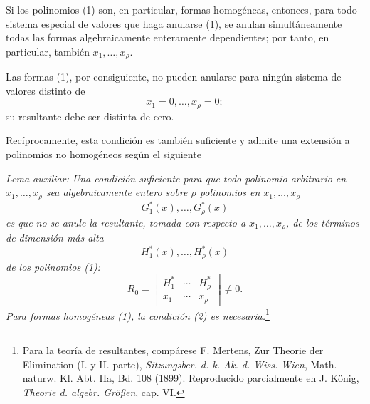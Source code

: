 \documentclass[11pt]{article}
\begin{document}
Si los polinomios (1) son, en particular, formas homogéneas, entonces, para todo sistema especial de valores que haga anularse (1), se anulan simultáneamente todas las formas algebraicamente enteramente dependientes; por tanto, en particular, también $x_1,\ldots,x_\rho$.

Las formas (1), por consiguiente, no pueden anularse para ningún sistema de valores distinto de
\[
  x_1=0,
  \ldots,
  x_\rho=0;
\]
su resultante debe ser distinta de cero.

Recíprocamente, esta condición es también suficiente y admite una extensión a polinomios no homogéneos según el siguiente

\emph{Lema auxiliar: Una condición suficiente para que todo polinomio arbitrario en $x_1,\ldots,x_\rho$ sea algebraicamente entero sobre $\rho$ polinomios en $x_1,\ldots,x_\rho$}
\[
  G_1^*(x),\ldots,G_\rho^*(x)
\]
\emph{es que no se anule la resultante, tomada con respecto a $x_1,\ldots,x_\rho$, de los términos de dimensión más alta}
\[
  H_1^*(x),\ldots,H_\rho^*(x)
\]
\emph{de los polinomios (1):}
\begin{equation}
  R_0=\left[
  \begin{array}{ccc}
    H_1^*&\cdots&H_\rho^*\\
    x_1&\cdots&x_\rho
  \end{array}
  \right]\ne0.
\tag{2}
\end{equation}
\emph{Para formas homogéneas (1), la condición (2) es necesaria.}\footnote{Para la teoría de resultantes, compárese F. Mertens, Zur Theorie der Elimination (I. y II. parte), \emph{Sitzungsber. d. k. Ak. d. Wiss. Wien}, Math.-naturw. Kl. Abt. IIa, Bd. 108 (1899). Reproducido parcialmente en J. König, \emph{Theorie d. algebr. Größen}, cap. VI.}
\end{document}
